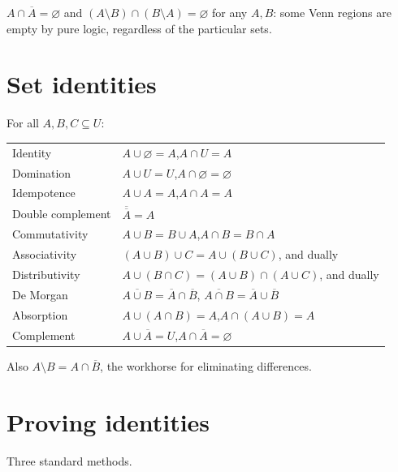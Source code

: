 \begin{example}
$A \cap \overline{A} = \varnothing$ and $(A \setminus B) \cap (B \setminus A)
= \varnothing$ for any $A, B$: some Venn regions are empty by pure logic,
regardless of the particular sets.
\end{example}

\section{Set identities}

\begin{theorem}\label{thm:setids}
For all $A, B, C \subseteq U$:
\begin{center}
\renewcommand{\arraystretch}{1.3}
\begin{tabular}{ll}
\toprule
Identity & $A \cup \varnothing = A$,\quad $A \cap U = A$\\
Domination & $A \cup U = U$,\quad $A \cap \varnothing = \varnothing$\\
Idempotence & $A \cup A = A$,\quad $A \cap A = A$\\
Double complement & $\overline{\overline{A}} = A$\\
Commutativity & $A \cup B = B \cup A$,\quad $A \cap B = B \cap A$\\
Associativity & $(A \cup B) \cup C = A \cup (B \cup C)$, and dually\\
Distributivity & $A \cup (B \cap C) = (A \cup B) \cap (A \cup C)$, and dually\\
De Morgan & $\overline{A \cup B} = \overline{A} \cap \overline{B}$,\quad
            $\overline{A \cap B} = \overline{A} \cup \overline{B}$\\
Absorption & $A \cup (A \cap B) = A$,\quad $A \cap (A \cup B) = A$\\
Complement & $A \cup \overline{A} = U$,\quad $A \cap \overline{A} = \varnothing$\\
\bottomrule
\end{tabular}
\end{center}
Also $A \setminus B = A \cap \overline{B}$, the workhorse for eliminating
differences.
\end{theorem}

\section{Proving identities}

Three standard methods.

